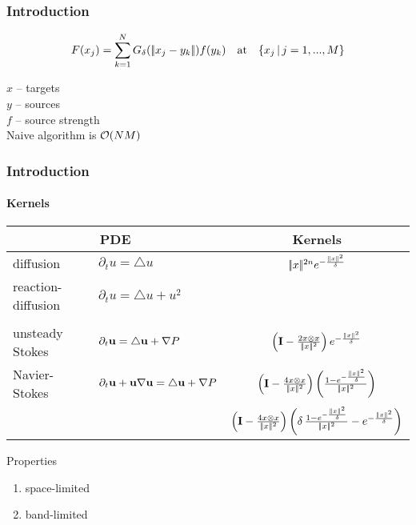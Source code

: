 \begin{frame}
\frametitle{Introduction }
\begin{block}{}
\[ F(x_j) = \sum_{k=1}^N G_\delta (|\!| x_j - y_k |\!|) f(y_k) \quad \text{at} \quad \{ x_j \, | \, j = 1,...,M \} \] 
\end{block}

$x$  --  targets \\
$y$  --  sources  \\
$f$   -- source strength  \\
Naive algorithm is $\mathcal{O}(NM)$ 
\end{frame}


\begin{frame}
\frametitle{Introduction }
\framesubtitle{Kernels}
{\footnotesize
\begin{table}[htbp]
\centering
\begin{tabular}{ll|c} \hline
                                       \multicolumn{2}{c|}{PDE}            &        Kernels       \\ \hline
diffusion  &  $\partial_t u = \triangle u$  &   $|\!| x  |\!|^{2n} e^{-\frac{|\!| x |\!|^2}{\delta}}$ \\
reaction-diffusion & $\partial_t u  = \triangle u + u^2$  & \\ 
& &  \\
\hline
unsteady Stokes & $\partial_t \mathbf{u}  = \triangle \mathbf{u} + \nabla P$   & $\left( \mathbf{I} - \frac{2x\otimes x}{|\!| x |\!|^2}\right) e^{-\frac{|\!| x |\!|^2}{\delta}}$ \\
Navier-Stokes &  $\partial_t \mathbf{u}  + \mathbf{u} \nabla \mathbf{u} = \triangle \mathbf{u} + \nabla P$   & $\left( \mathbf{I} - \frac{4  x\otimes x}{|\!| x |\!|^2}\right)\left(\frac{1 - e^{-\frac{|\!| x |\!|^2}{\delta}}}{|\!| x |\!|^2}\right)$  \\ 
& &  $ \left( \mathbf{I} - \frac{4  x\otimes x}{\norm{x}^2}\right)\left(\delta\,\frac{1 -  e^{-\frac{\norm{x}^2}{\delta}}}{\norm{x}^2} - e^{-\frac{\norm{x}^2}{\delta}}\right) $\\ \hline
\end{tabular}
\end{table}
}

\pause
\begin{block}{Properties}
\begin{enumerate}
 \item space-limited
 \item band-limited 
\end{enumerate}
\end{block}
\end{frame}

